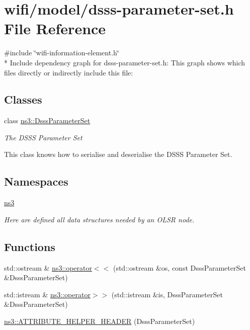 \hypertarget{dsss-parameter-set_8h}{}\section{wifi/model/dsss-\/parameter-\/set.h File Reference}
\label{dsss-parameter-set_8h}
{\ttfamily \#include \char`\"{}wifi-\/information-\/element.\+h\char`\"{}}\\*
Include dependency graph for dsss-\/parameter-\/set.h\+:
This graph shows which files directly or indirectly include this file\+:
\subsection*{Classes}
\begin{DoxyCompactItemize}
\item 
class \hyperlink{classns3_1_1DsssParameterSet}{ns3\+::\+Dsss\+Parameter\+Set}
\begin{DoxyCompactList}\small\item\em The D\+S\+SS Parameter Set

This class knows how to serialise and deserialise the D\+S\+SS Parameter Set. \end{DoxyCompactList}\end{DoxyCompactItemize}
\subsection*{Namespaces}
\begin{DoxyCompactItemize}
\item 
 \hyperlink{namespacens3}{ns3}
\begin{DoxyCompactList}\small\item\em Here are defined all data structures needed by an O\+L\+SR node. \end{DoxyCompactList}\end{DoxyCompactItemize}
\subsection*{Functions}
\begin{DoxyCompactItemize}
\item 
std\+::ostream \& \hyperlink{namespacens3_a21490531609fc9a45243c001d52d1d1c}{ns3\+::operator$<$$<$} (std\+::ostream \&os, const Dsss\+Parameter\+Set \&Dsss\+Parameter\+Set)
\item 
std\+::istream \& \hyperlink{namespacens3_a4c973e6253b36ca194b9c6fbb8416f24}{ns3\+::operator$>$$>$} (std\+::istream \&is, Dsss\+Parameter\+Set \&Dsss\+Parameter\+Set)
\item 
\hyperlink{namespacens3_a694efd1b2eb7a6e203db089d7ce71dd2}{ns3\+::\+A\+T\+T\+R\+I\+B\+U\+T\+E\+\_\+\+H\+E\+L\+P\+E\+R\+\_\+\+H\+E\+A\+D\+ER} (Dsss\+Parameter\+Set)
\end{DoxyCompactItemize}
